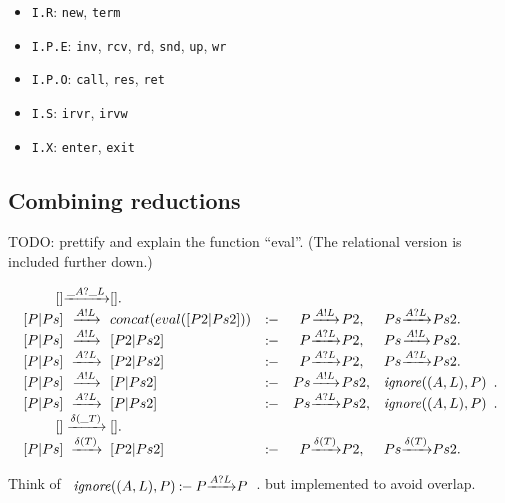 \begin{itemize}
\item \verb+I.R+:   \verb+new+, \verb+term+
\item \verb+I.P.E+: \verb+inv+, \verb+rcv+, \verb+rd+, \verb+snd+, \verb+up+, \verb+wr+
\item \verb+I.P.O+: \verb+call+, \verb+res+, \verb+ret+
\item \verb+I.S+:   \verb+irvr+, \verb+irvw+
\item \verb+I.X+:   \verb+enter+, \verb+exit+
\end{itemize}

\subsection{Combining reductions}

TODO: prettify and explain the function ``eval''. (The relational version is included further down.)

\[
\begin{array}{r@{}c@{}lcr@{}c@{}lr@{}c@{}l}
  \Preduce{[]}{\Phear{\_A}{\_L}}{[]}. & &
\\\Preduce{[ P | Ps ]}{\Psay{A}{L}} {concat(eval([P2 | Ps2]))}  &\Pif& \Preduce{P}{\Psay{A}{L}}{P2}  ,&  \Preduce{Ps}{\Phear{A}{L}}{Ps2}.
\\\Preduce{[ P | Ps ]}{\Psay{A}{L}} {[ P2 | Ps2 ]}  &\Pif& \Preduce{P} {\Phear{A}{L}}{P2}   ,&  \Preduce{Ps}{\Psay{A}{L}} {Ps2} .
\\\Preduce{[ P | Ps ]}{\Phear{A}{L}}{[ P2 | Ps2 ]}  &\Pif& \Preduce{P} {\Phear{A}{L}}{P2}   ,&  \Preduce{Ps}{\Phear{A}{L}}{Ps2} .
\\\Preduce{[ P | Ps ]}{\Psay{A}{L}} {[ P  | Ps2 ]}  &\Pif& \Preduce{Ps}{\Psay{A}{L}} {Ps2}  ,&  \multicolumn{3}{c}{\Pignore{((A,L),P)}}    .
\\\Preduce{[ P | Ps ]}{\Phear{A}{L}}{[ P  | Ps2 ]}  &\Pif& \Preduce{Ps}{\Phear{A}{L}}{Ps2}  ,&  \multicolumn{3}{c}{\Pignore{((A,L),P)}}    .
\\\Preduce{[]}{\delta(\_T)}{[]}. & &
\\\Preduce{[ P | Ps ]}{\delta(T)}{[ P2 | Ps2 ]}  &\Pif& \Preduce{P}{\delta(T)}{P2}    ,&  \Preduce{Ps}{\delta(T)}{Ps2}  .
\end{array}
\]

Think of
\(\begin{array}{r@{}c@{}l}\Pignore{((A,L),P)} \Pif
  \Preduce{P}{\Phear{A}{L}}{P}\end{array}\).
but implemented to avoid overlap.


